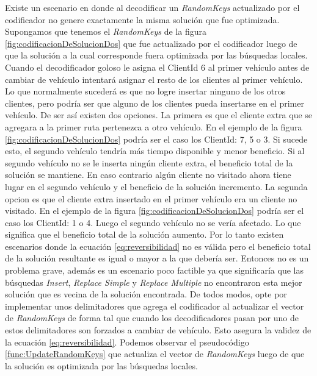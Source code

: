 Existe un escenario en donde al decodificar un \textit{RandomKeys} actualizado por el codificador no genere exactamente la misma solución que fue optimizada. Supongamos que tenemos el \textit{RandomKeys} de la figura \ref{fig:codificacionDeSolucionDos} que fue actualizado por el codificador luego de que la solución a la cual corresponde fuera optimizada por las búsquedas locales. Cuando el decodificador goloso le asigna el ClientId 6 al primer vehículo antes de cambiar de vehículo intentará asignar el resto de los clientes al primer vehículo. Lo que normalmente sucederá es que no logre insertar ninguno de los otros clientes, pero podría ser que alguno de los clientes pueda insertarse en el primer vehículo. De ser así existen dos opciones. La primera es que el cliente extra que se agregara a la primer ruta pertenezca a otro vehículo. En el ejemplo de la figura \ref{fig:codificacionDeSolucionDos} podría ser el caso los ClientId: 7, 5 o 3. Si sucede esto, el segundo vehículo tendría más tiempo disponible y menor beneficio. Si al segundo vehículo no se le inserta ningún cliente extra, el beneficio total de la solución se mantiene. En caso contrario algún cliente no visitado ahora tiene lugar en el segundo vehículo y el beneficio de la solución incremento. La segunda opcion es que el cliente extra insertado en el primer vehículo era un cliente no visitado. En el ejemplo de la figura \ref{fig:codificacionDeSolucionDos} podría ser el caso los ClientId: 1 o 4. Luego el segundo vehículo no se vería afectado. Lo que significa que el beneficio total de la solución aumento. Por lo tanto existen escenarios donde la ecuación \ref{eq:reversibilidad} no es válida pero el beneficio total de la solución resultante es igual o mayor a la que debería ser. Entonces no es un problema grave, además es un escenario poco factible ya que significaría que las búsquedas \textit{Insert}, \textit{Replace Simple} y \textit{Replace Multiple} no encontraron esta mejor solución que es vecina de la solución encontrada. De todos modos, opte por implementar unos delimitadores que agrega el codificador al actualizar el vector de \textit{RandomKeys} de forma tal que cuando los decodificadores pasan por uno de estos delimitadores son forzados a cambiar de vehículo. Esto asegura la validez de la ecuación \ref{eq:reversibilidad}. Podemos observar el pseudocódigo \ref{func:UpdateRandomKeys} que actualiza el vector de \textit{RandomKeys} luego de que la solución es optimizada por las búsquedas locales.

\bigskip

